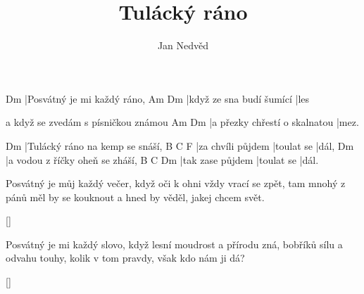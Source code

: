 \documentclass{song}
\title{Tulácký ráno}
\author{Jan Nedvěd}
\begin{document}
\strophe
Dm
|Posvátný je mi každý ráno,
Am                       Dm
|když ze sna budí šumící |les

a když se zvedám s písničkou známou
Am                            Dm
|a přezky chřestí o skalnatou |mez.
\endstrophe

Dm
|Tulácký ráno na kemp se snáší,
B                 C          F
|za chvíli půjdem |toulat se |dál,
Dm
|a vodou z říčky oheň se zháší,
B                C          Dm
|tak zase půjdem |toulat se |dál.
\endstrophe

\strophe*
Posvátný je můj každý večer,
když oči k ohni vždy vrací se zpět,
tam mnohý z pánů měl by se kouknout
a hned by věděl, jakej chcem svět.
\endstrophe

\ref{}

\strophe*
Posvátný je mi každý slovo,
když lesní moudrost a přírodu zná,
bobříků sílu a odvahu touhy,
kolik v tom pravdy, však kdo nám ji dá?
\endstrophe

\ref{}
\end{document}
